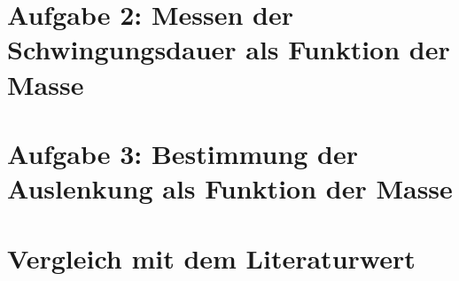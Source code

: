 \section{Aufgabe 2: Messen der Schwingungsdauer als Funktion der Masse}
\section{Aufgabe 3: Bestimmung der Auslenkung als Funktion der Masse}
\section{Vergleich mit dem Literaturwert}